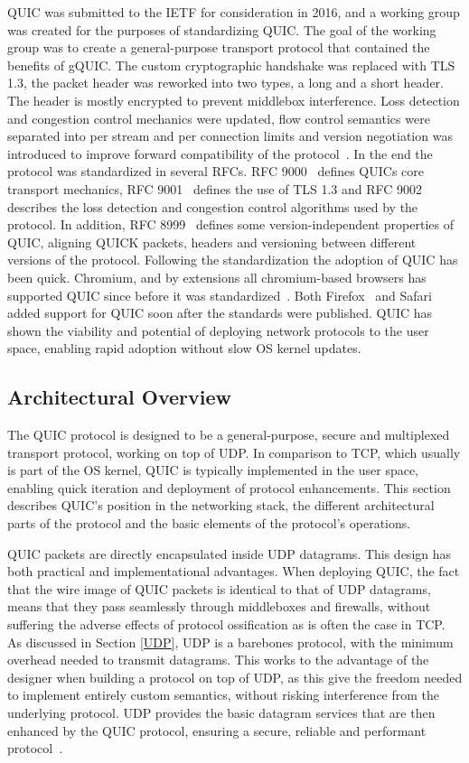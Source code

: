 \documentclass[english, 12pt, a4paper, elec, utf8, a-2b, online]{aaltothesis}
\begin{document}
QUIC was submitted to the IETF for consideration in 2016, and a working group
was created for the purposes of standardizing QUIC. The goal of the working group
was to create a general-purpose transport protocol that contained the benefits
of gQUIC. The custom cryptographic handshake was replaced with TLS 1.3, the packet header
was reworked into two types, a long and a short header. The header is mostly encrypted
to prevent middlebox interference. Loss detection and congestion control mechanics
were updated, flow control semantics were separated into per stream and per connection
limits and version negotiation was introduced to improve forward compatibility of the
protocol~\cite{rfc9000}. In the end the protocol was standardized in several RFCs.
RFC 9000~\cite{rfc9000} defines QUICs core transport mechanics, RFC 9001~\cite{rfc9001} defines the use of TLS 1.3
and RFC 9002~\cite{rfc9002} describes the loss detection and congestion control algorithms used by the
protocol. In addition, RFC 8999~\cite{rfc8999} defines some version-independent
properties of QUIC, aligning QUICK packets, headers and versioning between
different versions of the protocol. Following the standardization the adoption
of QUIC has been quick. Chromium, and by extensions all chromium-based browsers
has supported QUIC since before it was standardized~\cite{chromium_quic}. Both
Firefox~\cite{firefox_quic} and Safari~\cite{safari_quic} added support for QUIC
soon after the standards were published. QUIC has shown the viability and potential
of deploying network protocols to the user space, enabling rapid adoption without slow
OS kernel updates.

\subsection{Architectural Overview}

The QUIC protocol is designed to be a general-purpose, secure and multiplexed
transport protocol, working on top of UDP. In comparison to TCP, which usually
is part of the OS kernel, QUIC is typically implemented in the user space, enabling
quick iteration and deployment of protocol enhancements. This section describes
QUIC's position in the networking stack, the different architectural parts of the protocol
and the basic elements of the protocol's operations.

QUIC packets are directly encapsulated inside UDP datagrams. This design has both 
practical and implementational advantages. When deploying QUIC, the fact that the
wire image of QUIC packets is identical to that of UDP datagrams, means that they
pass seamlessly through middleboxes and firewalls, without suffering the adverse
effects of protocol ossification as is often the case in TCP. As discussed in Section \ref{UDP},
UDP is a barebones protocol, with the minimum overhead needed to transmit datagrams. This
works to the advantage of the designer when building a protocol on top of UDP, as
this give the freedom needed to implement entirely custom semantics, without risking
interference from the underlying protocol. UDP provides the basic datagram services
that are then enhanced by the QUIC protocol, ensuring a secure, reliable and performant
protocol~\cite{quic_transport_protocol_design}.
\end{document}
